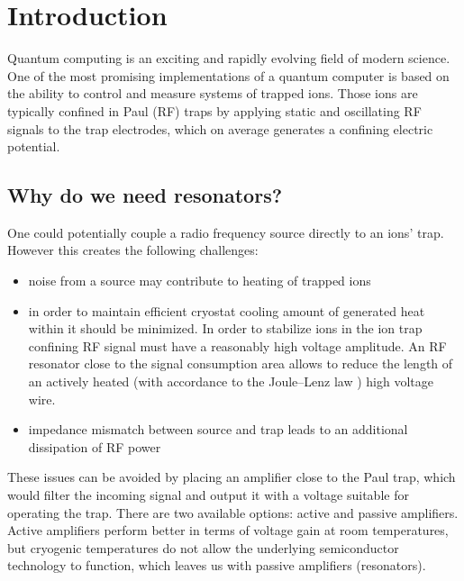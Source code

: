 \newcommand{\package}{\emph}

\chapter{Introduction}
Quantum computing is an exciting and rapidly evolving field of modern science. One of the most promising implementations of a quantum computer is based on the ability to control and measure systems of trapped ions. Those ions are typically confined in Paul (RF) \cite{Paul1990} traps by applying static and oscillating RF signals to the trap electrodes, which on average generates a confining electric potential.
\section{Why do we need resonators?}
\label{sec:why_resonators}
One could potentially couple a radio frequency source directly to an ions' trap. However this creates the following challenges:
\begin{itemize}
	\item noise from a source may contribute to heating of trapped ions \cite{Turchette2000}
	\item in order to maintain efficient cryostat cooling amount of generated heat within it should be minimized. In order to stabilize ions in the ion trap 	confining RF signal must have a reasonably high voltage amplitude. An RF resonator close to the signal consumption area allows to reduce the length of an actively heated (with accordance to the Joule–Lenz law \cite{Prokhorov1972}) high voltage wire.
	\item impedance mismatch between source and trap leads to an additional dissipation of RF power
\end{itemize}
These issues can be avoided by placing an amplifier close to the Paul trap, which would filter the incoming signal and output it with a voltage suitable for operating the trap. There are two available options: active and passive amplifiers. Active amplifiers perform better in terms of voltage gain at room temperatures, but cryogenic temperatures do not allow the underlying semiconductor technology to function, which leaves us with passive amplifiers (resonators).
